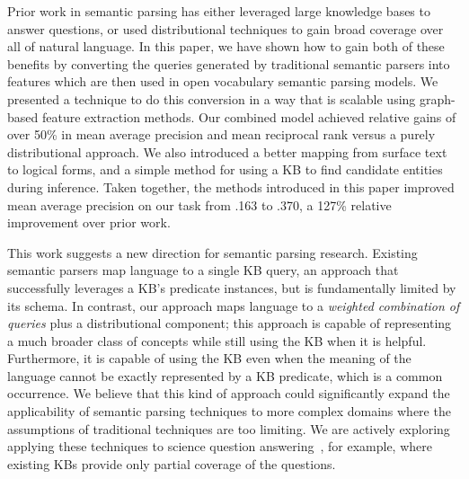 \documentclass[11pt,letterpaper]{article}
\begin{document}
Prior work in semantic parsing has either leveraged large knowledge bases to answer questions, or
used distributional techniques to gain broad coverage over all of natural language.  In this paper,
we have shown how to gain both of these benefits by converting the queries generated by traditional
semantic parsers into features which are then used in open vocabulary semantic parsing models.  We
presented a technique to do this conversion in a way that is scalable using graph-based feature
extraction methods.  Our combined model achieved relative gains of over 50\% in mean average
precision and mean reciprocal rank versus a purely distributional approach.  We also introduced a
better mapping from surface text to logical forms, and a simple method for using a KB to find
candidate entities during inference.  Taken together, the methods introduced in this paper improved
mean average precision on our task from .163 to .370, a 127\% relative improvement over prior work.

This work suggests a new direction for semantic parsing research.  Existing semantic parsers map
language to a single KB query, an approach that successfully leverages a KB's predicate instances,
but is fundamentally limited by its schema. In contrast, our approach maps language to a
\emph{weighted combination of queries} plus a distributional component; this approach is capable of
representing a much broader class of concepts while still using the KB when it is helpful.
Furthermore, it is capable of using the KB even when the meaning of the language cannot be exactly
represented by a KB predicate, which is a common occurrence. We believe that this kind of approach
could significantly expand the applicability of semantic parsing techniques to more complex domains
where the assumptions of traditional techniques are too limiting.  We are actively exploring
applying these techniques to science question answering~\cite{clark-2013-kb-requirements-for-qa},
for example, where existing KBs provide only partial coverage of the questions.

\end{document}
